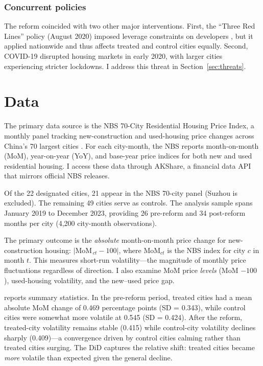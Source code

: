 \documentclass[12pt]{article}
\begin{document}
\subsubsection*{Concurrent policies} The reform coincided with two other major interventions. First, the ``Three Red Lines'' policy (August 2020) imposed leverage constraints on developers \citep{liu2022three}, but it applied nationwide and thus affects treated and control cities equally. Second, COVID-19 disrupted housing markets in early 2020, with larger cities experiencing stricter lockdowns. I address this threat in Section~\ref{sec:threats}.

\section{Data}

The primary data source is the NBS 70-City Residential Housing Price Index, a monthly panel tracking new-construction and used-housing price changes across China's 70 largest cities \citep{deng2012land}. For each city-month, the NBS reports month-on-month (MoM), year-on-year (YoY), and base-year price indices for both new and used residential housing. I access these data through AKShare, a financial data API that mirrors official NBS releases.

Of the 22 designated cities, 21 appear in the NBS 70-city panel (Suzhou is excluded). The remaining 49 cities serve as controls. The analysis sample spans January 2019 to December 2023, providing 26 pre-reform and 34 post-reform months per city (4,200 city-month observations).

The primary outcome is the \textit{absolute} month-on-month price change for new-construction housing: $|$MoM$_{\,ct} - 100|$, where MoM$_{ct}$ is the NBS index for city $c$ in month $t$. This measures short-run volatility---the magnitude of monthly price fluctuations regardless of direction. I also examine MoM price \textit{levels} (MoM $- 100$), used-housing volatility, and the new--used price gap.

 reports summary statistics. In the pre-reform period, treated cities had a mean absolute MoM change of 0.469 percentage points (SD = 0.343), while control cities were somewhat more volatile at 0.545 (SD = 0.424). After the reform, treated-city volatility remains stable (0.415) while control-city volatility declines sharply (0.409)---a convergence driven by control cities calming rather than treated cities surging. The DiD captures the relative shift: treated cities became \textit{more} volatile than expected given the general decline.
\end{document}
